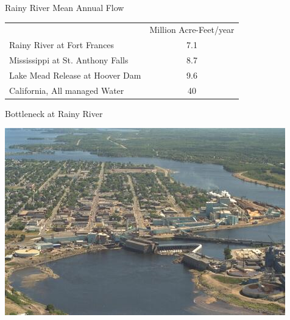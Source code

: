 \documentclass[compress,english]{beamer}
\begin{document}
\begin{frame}{Rainy River Mean Annual Flow}

\begin{center}
\end{center}

\hfill\begin{tabular}{lc}
& Million Acre-Feet/year \\
Rainy River at Fort Frances & 7.1 \\
Mississippi at St. Anthony Falls & 8.7 \\
Lake Mead Release at Hoover Dam & 9.6  \\
California, All managed Water & 40 \\
\end{tabular}\hfill
\end{frame}


\begin{frame}{Bottleneck at Rainy River}

\begin{center}
\includegraphics[height=0.7\paperheight]{mill.jpg}
\end{center}

\end{frame}
\end{document}
